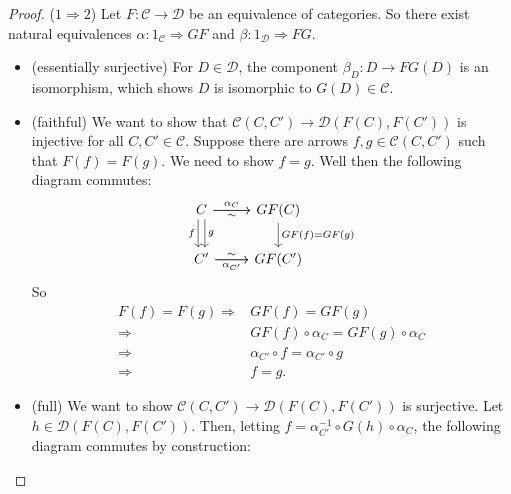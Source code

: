 \documentclass[12pt]{article}
\begin{document}
\begin{proof}
	($1\Rightarrow 2$) Let $F:\mathcal{C}\to\mathcal{D}$ be an equivalence of categories. So there exist natural equivalences $\alpha: 1_\mathcal{C}\Rightarrow GF$ and $\beta: 1_\mathcal{D}\Rightarrow FG$.
	\begin{itemize}
		\item (essentially surjective) For $D\in\mathcal{D}$, the component $\beta_D:D\to FG(D)$ is an isomorphism, which shows $D$ is isomorphic to $G(D)\in\mathcal{C}$.
		\item (faithful) We want to show that $\mathcal{C}(C,C')\to\mathcal{D}(F(C), F(C'))$ is injective for all $C,C'\in\mathcal{C}$. Suppose there are arrows $f,g\in\mathcal{C}(C,C')$ such that $F(f)=F(g)$. We need to show $f=g$. Well then the following diagram commutes:
			\begin{equation*}
\begin{tikzcd}
C \arrow[d, "f"', shift right] \arrow[d, "g", shift left] \arrow[r, "\alpha_C"] \arrow[r, "\sim"'] & GF(C) \arrow[d, "GF(f)=GF(g)"] \\
C' \arrow[r, "\alpha_{C'}"'] \arrow[r, "\sim"]                                                     & GF(C')                        
\end{tikzcd}
			\end{equation*}
			So 
			\begin{align*}
				F(f)=F(g) \Rightarrow& GF(f)=GF(g) \\
				\Rightarrow& GF(f)\circ\alpha_C = GF(g)\circ\alpha_C \\
				\Rightarrow& \alpha_{C'}\circ f = \alpha_{C'}\circ g \\
				\Rightarrow& f=g.
			\end{align*}
		\item (full) We want to show $\mathcal{C}(C,C')\to \mathcal{D}(F(C), F(C'))$ is surjective. Let $h\in\mathcal{D}(F(C), F(C'))$. Then, letting $f=\alpha_{C'}^{-1}\circ G(h) \circ \alpha_C$, the following diagram commutes by construction:
			\begin{equation*}

\end{equation*}
\end{itemize}
\end{proof}
\end{document}
